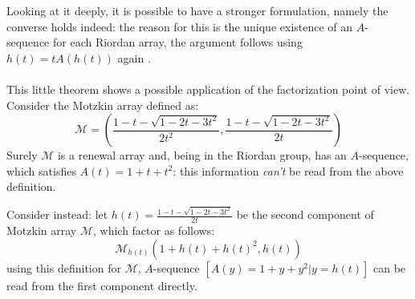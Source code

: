 Looking at it deeply, it is possible to have a stronger formulation, namely the 
converse holds indeed: the reason for this is the unique existence of an $A$-sequence
for each Riordan array, the argument follows using $h(t)=tA(h(t))$ again .
\\\\
This little theorem shows a possible application of the factorization point of view.
Consider the Motzkin array defined as:
\begin{displaymath} 
    \mathcal{M} =\left( \frac{1-t-\sqrt{1-2t-3t^2}}{2t^2},
       \frac{1-t-\sqrt{1-2t-3t^2}}{2t}  \right)
\end{displaymath} 
Surely $\mathcal{M}$ is a renewal array and, being in the Riordan group, 
has an $A$-sequence, which satisfies $A(t)=1+t+t^2$: 
this information \emph{can't} be read from the above definition.

Consider instead: let $h(t)=\frac{1-t-\sqrt{1-2t-3t^2}}{2t}$ be the second
component of Motzkin array $\mathcal{M}$, which factor as follows:
\begin{displaymath} 
    \mathcal{M}_{h(t)}\left( 1+h(t)+h(t)^2, h(t) \right) 
\end{displaymath} 
using this definition for $\mathcal{M}$, $A$-sequence $[A(y)=1+y+y^2|y=h(t)]$ can
be read from the first component directly.

